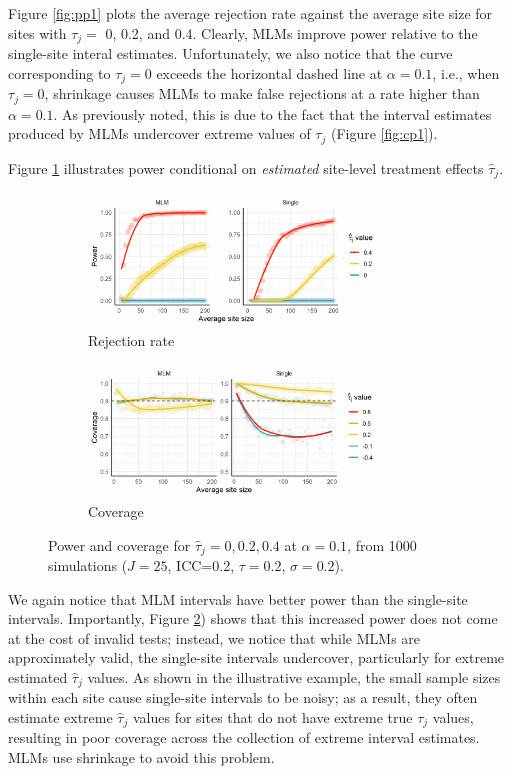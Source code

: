 \documentclass[]{article}
\begin{document}
Figure \ref{fig:pp1} plots the average rejection rate against the average site size for sites with $\tau_j =$ 0, 0.2, and 0.4.
Clearly, MLMs improve power relative to the single-site interal estimates.
Unfortunately, we also notice that the curve corresponding to $\tau_j = 0$ exceeds the horizontal dashed line at $\alpha=0.1$, i.e., when $\tau_j = 0$, shrinkage causes MLMs to make false rejections at a rate higher than $\alpha=0.1$.
As previously noted, this is due to the fact that the interval estimates produced by MLMs undercover extreme values of $\tau_j$ (Figure \ref{fig:cp1}).

Figure \ref{fig:pp2} illustrates power conditional on \textit{estimated} site-level treatment effects $\hat{\tau}_j$.
\begin{figure}[t]
    \centering
    \begin{subfigure}[a]{\textwidth}
        \centering
    	\includegraphics[width=0.85\textwidth]{pp2}
        \caption{Rejection rate}
    	\label{fig:pp2}
    \end{subfigure}
    \vfill
    \begin{subfigure}[b]{\textwidth}
        \centering
    	\includegraphics[width=0.85\textwidth]{cp2}
        \caption{Coverage}
    	\label{fig:cp2}
    \end{subfigure}
    \caption{Power and coverage for $\hat{\tau}_j = 0, 0.2, 0.4$ at $\alpha=0.1$, from 1000 simulations ($J=25$, ICC=0.2, $\tau=0.2$, $\sigma=0.2$).}
    \label{fig:pcp2}
\end{figure}
We again notice that MLM intervals have better power than the single-site intervals.
Importantly, Figure \ref{fig:cp2}) shows that this increased power does not come at the cost of invalid tests; instead, we notice that while MLMs are approximately valid, the single-site intervals undercover, particularly for extreme estimated $\hat{\tau}_j$ values.
As shown in the illustrative example, the small sample sizes within each site cause single-site intervals to be noisy; as a result, they often estimate extreme $\hat{\tau}_j$ values for sites that do not have extreme true $\tau_j$ values, resulting in poor coverage across the collection of extreme interval estimates.
MLMs use shrinkage to avoid this problem.
\end{document}
